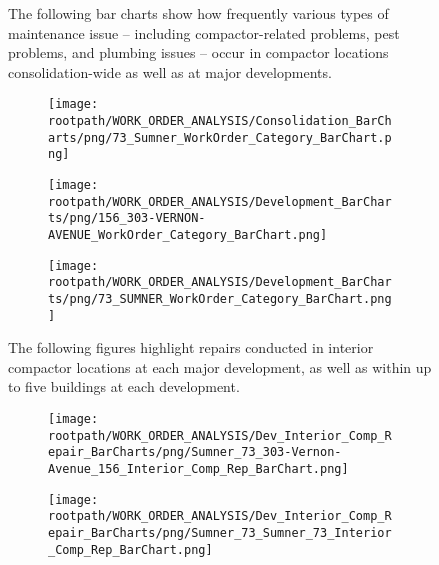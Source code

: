 \begin{figure}[h]
                                \sf
                                The following bar charts show how frequently various types of maintenance issue -- including compactor-related problems, pest problems, and plumbing issues -- occur in compactor locations consolidation-wide as well as at major developments.
                                \raggedright
                                \begin{subfigure}{\textwidth}
                                \texttt{[image: \\rootpath/WORK\_ORDER\_ANALYSIS/Consolidation\_BarCharts/png/73\_Sumner\_WorkOrder\_Category\_BarChart.png]}
                                \end{subfigure}
                                \begin{subfigure}{0.45\textwidth}
                                        \texttt{[image: \\rootpath/WORK\_ORDER\_ANALYSIS/Development\_BarCharts/png/156\_303-VERNON-AVENUE\_WorkOrder\_Category\_BarChart.png]}
                                        \end{subfigure}
                                        \begin{subfigure}{0.45\textwidth}
                                        \texttt{[image: \\rootpath/WORK\_ORDER\_ANALYSIS/Development\_BarCharts/png/73\_SUMNER\_WorkOrder\_Category\_BarChart.png]}
                                        \end{subfigure}
                                        \end{figure}
\begin{figure}[h]
                                \raggedright
                                \sf
                                The following figures highlight repairs conducted in interior compactor locations at each major development, as well as within up to five buildings at each development.\\
                                \begin{subfigure}{0.45\textwidth}
                                        \texttt{[image: \\rootpath/WORK\_ORDER\_ANALYSIS/Dev\_Interior\_Comp\_Repair\_BarCharts/png/Sumner\_73\_303-Vernon-Avenue\_156\_Interior\_Comp\_Rep\_BarChart.png]}
                                        \end{subfigure}
                                        \begin{subfigure}{0.45\textwidth}
                                        \texttt{[image: \\rootpath/WORK\_ORDER\_ANALYSIS/Dev\_Interior\_Comp\_Repair\_BarCharts/png/Sumner\_73\_Sumner\_73\_Interior\_Comp\_Rep\_BarChart.png]}
                                        \end{subfigure}
                                        
\end{figure}
